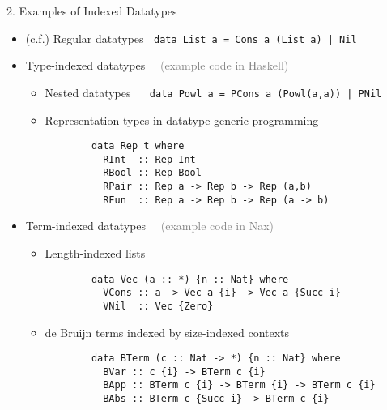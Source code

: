 \documentclass[final]{beamer}
\begin{document}
\begin{frame}[fragile]
\begin{columns}[t]
\begin{column}{.315\linewidth}
\begin{block}{2. Examples of Indexed Datatypes}
\begin{itemize}
\item[]$\!\!\!\!\!\!${\normalsize(c.f.)} Regular datatypes
	$~$ \lstinline!data List a = Cons a (List a) | Nil!
\item Type-indexed datatypes
	$\quad$\textcolor{gray}{\normalsize(example code in Haskell)}
	\begin{itemize}
		\item Nested datatypes $\quad$
			\lstinline!data Powl a = PCons a (Powl(a,a)) | PNil!
		\item Representation types in datatype generic programming
		\begin{lstlisting}
		data Rep t where
		  RInt  :: Rep Int
		  RBool :: Rep Bool
		  RPair :: Rep a -> Rep b -> Rep (a,b)
		  RFun  :: Rep a -> Rep b -> Rep (a -> b)
		\end{lstlisting}
	\end{itemize}
\item Term-indexed datatypes
	$\quad$\textcolor{gray}{\normalsize(example code in Nax)}
	\begin{itemize}
        	\item Length-indexed lists
		\begin{lstlisting}
		data Vec (a :: *) {n :: Nat} where
		  VCons :: a -> Vec a {i} -> Vec a {Succ i}
		  VNil  :: Vec {Zero}
		\end{lstlisting}
		\item de Bruijn terms indexed by size-indexed contexts
		\begin{lstlisting}
		data BTerm (c :: Nat -> *) {n :: Nat} where
		  BVar :: c {i} -> BTerm c {i}
		  BApp :: BTerm c {i} -> BTerm {i} -> BTerm c {i}
		  BAbs :: BTerm c {Succ i} -> BTerm c {i}
		\end{lstlisting}
	\end{itemize}
\end{itemize} %
\end{block}

\end{column}
\begin{column}{.315\linewidth}


\end{column}
\end{columns}
\end{frame}
\end{document}
